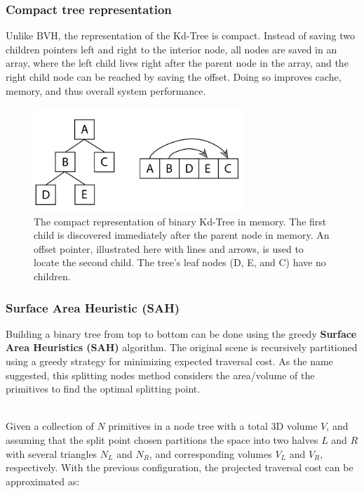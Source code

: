 \documentclass[11pt,a4paper]{article}
\begin{document}
\subsubsection{Compact tree representation}
Unlike BVH, the representation of the Kd-Tree is compact. Instead of saving two children pointers left and right to the interior node,  all nodes are saved in an array, where the left child lives right after the parent node in the array, and the right child node can be reached by saving the offset. Doing so improves cache, memory, and thus overall system performance.



\begin{figure}[h]	
     \centering
     \captionsetup{justification=centering,margin=2cm}
     \includegraphics[width=8cm]{images/kdtree/compact.png}
     \caption{The compact representation of binary Kd-Tree in memory. The first child is discovered immediately after the parent node in memory. An offset pointer, illustrated here with lines and arrows, is used to locate the second child. The tree's leaf nodes (D, E, and C) have no children. \protect\cite{Pharr2016}}
        \label{fig:dice}
\end{figure}


\subsubsection{Surface Area Heuristic (SAH)}
Building a binary tree from top to bottom can be done using the greedy \textbf{Surface Area Heuristics (SAH)} algorithm. The original scene is recursively partitioned using a greedy strategy for minimizing expected traversal cost. As the name suggested, this splitting nodes method considers the area/volume of the primitives to find the optimal splitting point.


\noindent
\\
Given a collection of $N$ primitives in a node tree with a total 3D volume $V$, and assuming that the split point chosen partitions the space into two halves $L$ and $R$ with several triangles $N_L$ and $N_R$, and corresponding volumes $V_L$ and $V_R$, respectively. With the previous configuration, the projected traversal cost can be approximated as:
\end{document}
